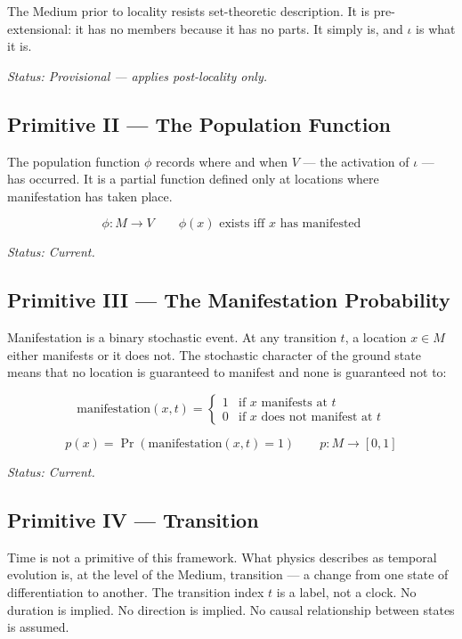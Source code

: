 \documentclass[11pt]{article}
\begin{document}
The Medium prior to locality resists set-theoretic description. It is
pre-extensional: it has no members because it has no parts. It simply is,
and \(\iota\) is what it is.

\emph{Status: Provisional — applies post-locality only.}
\subsection{Primitive II — The Population Function}
\label{sec:org78f4954}

The population function \(\phi\) records where and when \(V\) — the activation of
\(\iota\) — has occurred. It is a partial function defined only at locations where
manifestation has taken place.

\begin{equation}
\phi : M \rightarrow V \qquad \phi(x) \text{ exists iff } x \text{ has manifested}
\end{equation}

\emph{Status: Current.}
\subsection{Primitive III — The Manifestation Probability}
\label{sec:org9ebb1fa}

Manifestation is a binary stochastic event. At any transition \(t\), a location
\(x \in M\) either manifests or it does not. The stochastic character of the
ground state means that no location is guaranteed to manifest and none is
guaranteed not to:

\begin{equation}
\text{manifestation}(x,t) = \begin{cases} 1 & \text{if } x \text{ manifests at } t \\ 0 & \text{if } x \text{ does not manifest at } t \end{cases}
\end{equation}

\begin{equation}
p(x) = \Pr(\text{manifestation}(x,t) = 1) \qquad p : M \rightarrow [0,1]
\end{equation}

\emph{Status: Current.}
\subsection{Primitive IV — Transition}
\label{sec:org3035582}

Time is not a primitive of this framework. What physics describes as temporal
evolution is, at the level of the Medium, transition — a change from one state
of differentiation to another. The transition index \(t\) is a label, not a clock.
No duration is implied. No direction is implied. No causal relationship between
states is assumed.
\end{document}
